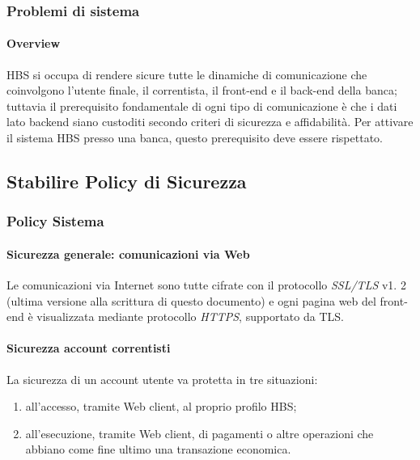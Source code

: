 \subsubsection{Problemi di sistema }
\paragraph{Overview}	HBS si occupa di rendere sicure tutte le dinamiche di comunicazione che coinvolgono l'utente finale, il correntista, il front-end e il back-end della banca; tuttavia il prerequisito fondamentale di ogni tipo di comunicazione è che i dati lato backend siano custoditi secondo criteri di sicurezza e affidabilità. Per attivare il sistema HBS presso una banca, questo prerequisito deve essere rispettato.
















\subsection{Stabilire Policy di Sicurezza}


\subsubsection{Policy Sistema}

\paragraph{Sicurezza generale: comunicazioni via Web}
Le comunicazioni via Internet sono tutte cifrate con il protocollo \emph{SSL/TLS} v1. 2 (ultima versione alla scrittura di questo documento) e ogni pagina web del front-end è visualizzata mediante protocollo \emph{HTTPS}, supportato da TLS.




\paragraph{Sicurezza account correntisti}
La sicurezza di un account utente va protetta in tre situazioni:
\begin{enumerate}
\item all'accesso, tramite Web client, al proprio profilo HBS;
\item all'esecuzione, tramite Web client, di pagamenti o altre operazioni che abbiano come fine ultimo una transazione economica.
\end{enumerate}

